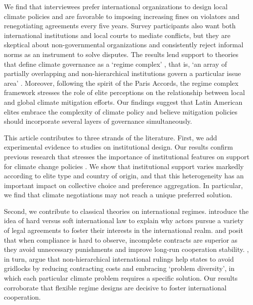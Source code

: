 \documentclass[a4paper,12pt]{article}
\begin{document}
We find that interviewees prefer international organizations to design local climate policies and are favorable to imposing increasing fines on violators and renegotiating agreements every five years. Survey participants also want both international institutions and local courts to mediate conflicts, but they are skeptical about non-governmental organizations and consistently reject informal norms as an instrument to solve disputes. The results lend support to theories that define climate governance as a `regime complex' \citep{colgan2012punctuated, keohane2011regime}, that is, `an array of partially overlapping and non-hierarchical institutions govern a particular issue area' \citep[279]{raustiala2004regime}. Moreover, following the spirit of the Paris Accords, the regime complex framework stresses the role of elite perceptions on the relationship between local and global climate mitigation efforts. Our findings suggest that Latin American elites embrace the complexity of climate policy and believe mitigation policies should incorporate several layers of governance simultaneously.

This article contributes to three strands of the literature. First, we add experimental evidence to studies on institutional design. Our results confirm previous research that stresses the importance of institutional features on support for climate change policies \citep{aklin2013understanding, bechtel2013mass, bechtel2017interests}. We show that institutional support varies markedly according to elite type and country of origin, and that this heterogeneity has an important impact on collective choice and preference aggregation. In particular, we find that climate negotiations may not reach a unique preferred solution.

Second, we contribute to classical theories on international regimes. \citet{abbott2000hard} introduce the idea of hard versus soft international law to explain why actors pursue a variety of legal agreements to foster their interests in the international realm. \citet{mildenberger2017beliefs} and \citet{rosendorff2001optimal} posit that when compliance is hard to observe, incomplete contracts are superior as they avoid unnecessary punishments and improve long-run cooperation stability. \citet{keohane2011regime}, in turn, argue that non-hierarchical international rulings help states to avoid gridlocks by reducing contracting costs and embracing `problem diversity', in which each particular climate problem requires a specific solution. Our results corroborate that flexible regime designs are decisive to foster international cooperation.
\end{document}
